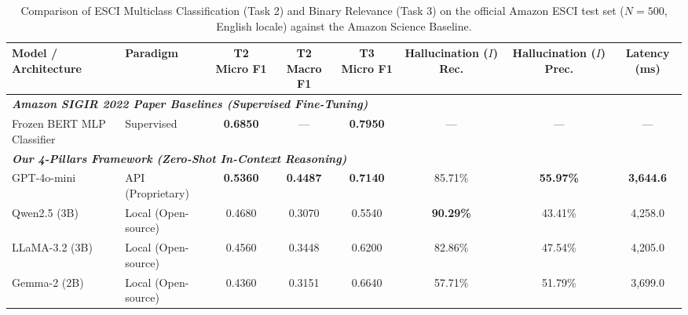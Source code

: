 
\begin{table}[t]
\centering
\caption{Comparison of ESCI Multiclass Classification (Task 2) and Binary Relevance (Task 3) on the official Amazon ESCI test set ($N=500$, English locale) against the Amazon Science Baseline.}
\label{tab:esci_benchmark_results}
\small
\begin{tabular}{llcccccc}
\toprule
\textbf{Model / Architecture} & \textbf{Paradigm} & \textbf{T2 Micro F1} & \textbf{T2 Macro F1} & \textbf{T3 Micro F1} & \textbf{Hallucination ($I$) Rec.} & \textbf{Hallucination ($I$) Prec.} & \textbf{Latency (ms)} \\
\midrule
\multicolumn{8}{l}{\textit{\textbf{Amazon SIGIR 2022 Paper Baselines (Supervised Fine-Tuning)}}} \\
Frozen BERT MLP Classifier & Supervised & \textbf{0.6850} & --- & \textbf{0.7950} & --- & --- & --- \\
\midrule
\multicolumn{8}{l}{\textit{\textbf{Our 4-Pillars Framework (Zero-Shot In-Context Reasoning)}}} \\
GPT-4o-mini & API (Proprietary) & \textbf{0.5360} & \textbf{0.4487} & \textbf{0.7140} & 85.71\% & \textbf{55.97\%} & \textbf{3,644.6} \\
Qwen2.5 (3B) & Local (Open-source) & 0.4680 & 0.3070 & 0.5540 & \textbf{90.29\%} & 43.41\% & 4,258.0 \\
LLaMA-3.2 (3B) & Local (Open-source) & 0.4560 & 0.3448 & 0.6200 & 82.86\% & 47.54\% & 4,205.0 \\
Gemma-2 (2B) & Local (Open-source) & 0.4360 & 0.3151 & 0.6640 & 57.71\% & 51.79\% & 3,699.0 \\
\bottomrule
\end{tabular}
\end{table}

